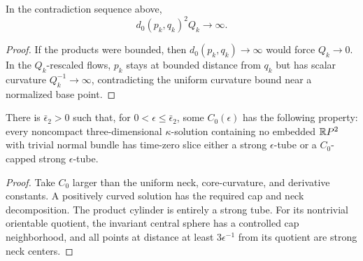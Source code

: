 \begin{claim}\label{claim:kq-scale-separation}
In the contradiction sequence above,
\[
 d_0(p_k,q_k)^2Q_k\longrightarrow\infty.
\]
\end{claim}
\begin{proof}
\sketch
{}
If the products were bounded, then $d_0(p_k,q_k)\to\infty$ would
force $Q_k\to0$. In the $Q_k$-rescaled flows, $p_k$ stays at bounded
distance from $q_k$ but has scalar curvature $Q_k^{-1}\to\infty$,
contradicting the uniform curvature bound near a normalized base
point.
\end{proof}

\begin{corollary}\label{cor:noncompact-kappa-solution-tube-structure}
\label{noncompkappa}

There is $\bar\epsilon_2>0$ such that, for
$0<\epsilon\leq\bar\epsilon_2$, some $C_0(\epsilon)$ has the
following property: every noncompact three-dimensional
$\kappa$-solution containing no embedded $\mathbb{R} P^2$ with trivial
normal bundle has time-zero slice either a strong $\epsilon$-tube
or a $C_0$-capped strong $\epsilon$-tube.
\end{corollary}
\begin{proof}
\sketch
{}
Take $C_0$ larger than the uniform neck, core-curvature, and
derivative constants. A positively curved solution has the required
cap and neck decomposition. The product cylinder is entirely a
strong tube. For its nontrivial orientable quotient, the invariant
central sphere has a controlled cap neighborhood, and all points at
distance at least $3\epsilon^{-1}$ from its quotient are strong neck
centers.
\end{proof}

